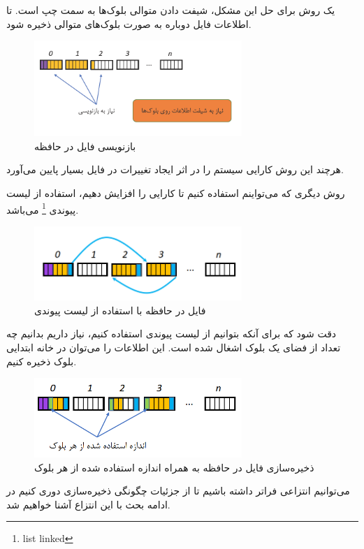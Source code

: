 \begin{flushright}
    یک روش برای حل این مشکل، شیفت دادن متوالی بلوک‌ها به سمت چپ است.
    تا اطلاعات فایل دوباره به صورت بلوک‌های متوالی ذخیره شود.

    \begin{figure}[H]
        \centering
        \includegraphics[width=0.7\textwidth]{source/shift-file}
        \caption{بازنویسی فایل در حافظه}
        \label{fig:shift-file}
    \end{figure}

    هرچند این روش کارایی سیستم را در اثر ایجاد تغییرات در فایل بسیار پایین می‌آورد.

    روش دیگری که می‌تواینم استفاده کنیم تا کارایی را افزایش دهیم، استفاده از
    لیست پیوندی
    \footnote{list linked}
    می‌باشد.

    \begin{figure}[H]
        \centering
        \includegraphics[width=0.7\textwidth]{source/file-in-memory-model-4}
        \caption{فایل در حافظه با استفاده از لیست پیوندی}
        \label{fig:file-in-memory-model-4}
    \end{figure}

    دقت شود که برای آنکه بتوانیم از لیست پیوندی استفاده کنیم، نیاز داریم بدانیم چه تعداد از فضای یک بلوک اشغال شده است.
    این اطلاعات را می‌توان در خانه ابتدایی بلوک ذخیره کنیم.

    \begin{figure}[H]
        \centering
        \includegraphics[width=0.7\textwidth]{source/file-in-memory-model-5}
        \caption{ذخیره‌سازی فایل در حافظه به همراه اندازه استفاده شده از هر بلوک}
        \label{fig:file-in-memory-model-5}
    \end{figure}

    می‌توانیم انتزاعی فراتر داشته باشیم تا از جزئیات چگونگی ذخیره‌سازی دوری کنیم در ادامه بحث با این انتزاع آشنا خواهیم شد.
\end{flushright}